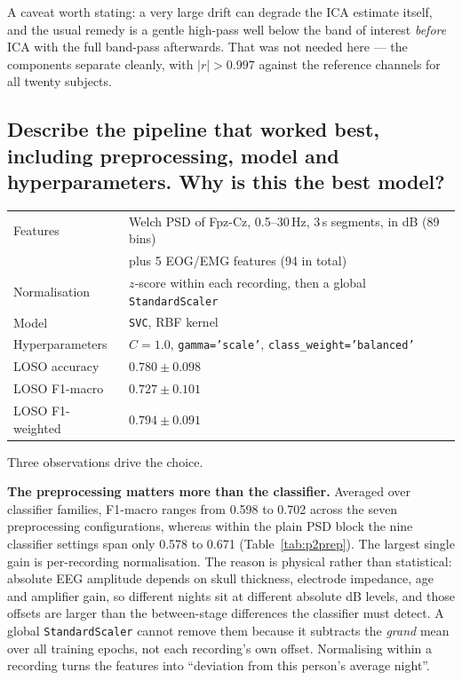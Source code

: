 \documentclass[11pt,a4paper]{article}
\newcommand{\hertz}{Hz}
\newcommand{\second}{s}
\newcommand{\num}[1]{#1}
\newcommand{\SI}[2]{#1\,#2}
\newcommand{\SIrange}[3]{#1--#2\,#3}
\newcommand{\Q}[1]{\subsection*{#1}}
\begin{document}
A caveat worth stating: a very large drift can degrade the ICA estimate itself, and the usual
remedy is a gentle high-pass well below the band of interest \emph{before} ICA with the full
band-pass afterwards. That was not needed here --- the components separate cleanly, with
$|r|>0.997$ against the reference channels for all twenty subjects.

\Q{Describe the pipeline that worked best, including preprocessing, model and hyperparameters.
Why is this the best model?}

\begin{center}\small
\begin{tabular}{ll}
\toprule
Features & Welch PSD of Fpz-Cz, \SIrange{0.5}{30}{\hertz}, \SI{3}{\second} segments, in dB (89 bins) \\
         & plus 5 EOG/EMG features (94 in total) \\
Normalisation & $z$-score within each recording, then a global \texttt{StandardScaler} \\
Model    & \texttt{SVC}, RBF kernel \\
Hyperparameters & $C=1.0$, \texttt{gamma='scale'}, \texttt{class\_weight='balanced'} \\
\midrule
LOSO accuracy    & $0.780 \pm 0.098$ \\
LOSO F1-macro    & $\mathbf{0.727 \pm 0.101}$ \\
LOSO F1-weighted & $0.794 \pm 0.091$ \\
\bottomrule
\end{tabular}
\end{center}

Three observations drive the choice.

\textbf{The preprocessing matters more than the classifier.} Averaged over classifier families,
F1-macro ranges from \num{0.598} to \num{0.702} across the seven preprocessing configurations,
whereas within the plain PSD block the nine classifier settings span only \num{0.578} to
\num{0.671} (Table~\ref{tab:p2prep}). The largest single gain is per-recording normalisation.
The reason is physical rather than statistical: absolute EEG amplitude depends on skull
thickness, electrode impedance, age and amplifier gain, so different nights sit at different
absolute dB levels, and those offsets are larger than the between-stage differences the
classifier must detect. A global \texttt{StandardScaler} cannot remove them because it
subtracts the \emph{grand} mean over all training epochs, not each recording's own offset.
Normalising within a recording turns the features into ``deviation from this person's average
night''.
\end{document}
